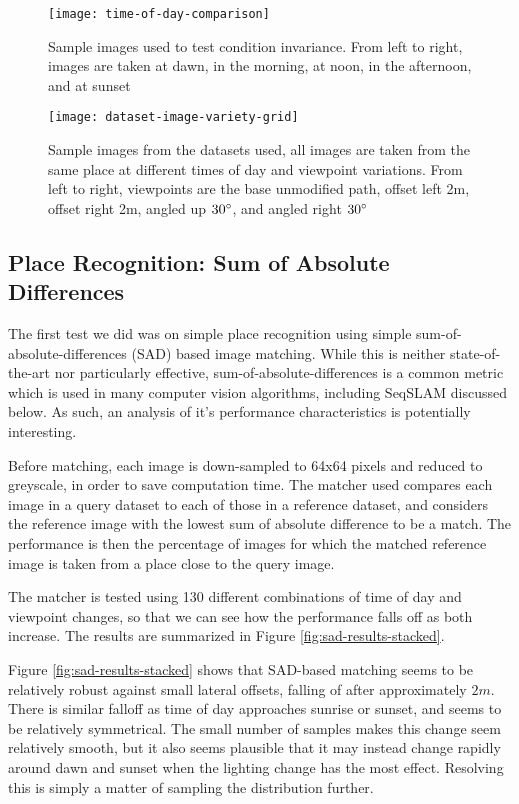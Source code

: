 \documentclass[letterpaper, 10 pt, conference]{ieeeconf}  %
\begin{document}
\begin{figure*}[t]
    \texttt{[image: time-of-day-comparison]}
    \caption{Sample images used to test condition invariance. From left to right, images are taken at dawn, in the morning, at noon, in the afternoon, and at sunset}
    \label{fig:dataset-time-of-day-example}
\end{figure*}

\begin{figure}[t]
    \texttt{[image: dataset-image-variety-grid]}
    \caption{Sample images from the datasets used, all images are taken from the same place at different times of day and viewpoint variations. From left to right, viewpoints are the base unmodified path, offset left 2m, offset right 2m, angled up $30\degree$, and angled right $30\degree$}
    \label{fig:dataset-example}
\end{figure}

\subsection{Place Recognition: Sum of Absolute Differences}

The first test we did was on simple place recognition using simple sum-of-absolute-differences (SAD) based image matching. While this is neither state-of-the-art nor particularly effective, sum-of-absolute-differences is a common metric which is used in many computer vision algorithms, including SeqSLAM discussed below. As such, an analysis of it's performance characteristics is potentially interesting.

Before matching, each image is down-sampled to 64x64 pixels and reduced to greyscale, in order to save computation time. The matcher used compares each image in a query dataset to each of those in a reference dataset, and considers the reference image with the lowest sum of absolute difference to be a match. The performance is then the percentage of images for which the matched reference image is taken from a place close to the query image.

The matcher is tested using 130 different combinations of time of day and viewpoint changes, so that we can see how the performance falls off as both increase. The results are summarized in Figure \ref{fig:sad-results-stacked}.

Figure \ref{fig:sad-results-stacked} shows that SAD-based matching seems to be relatively robust against small lateral offsets, falling of after approximately $2m$. There is similar falloff as time of day approaches sunrise or sunset, and seems to be relatively symmetrical. The small number of samples makes this change seem relatively smooth, but it also seems plausible that it may instead change rapidly around dawn and sunset when the lighting change has the most effect. Resolving this is simply a matter of sampling the distribution further.
\end{document}

